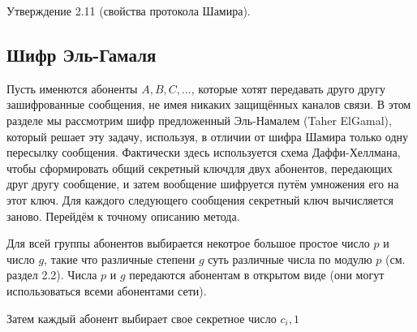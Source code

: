 \documentclass{article}
\begin{document}
 
Утверждение 2.11 (свойства протокола Шамира).
 
\setcounter{section}{2}
\setcounter{subsection}{4}
\subsection{Шифр Эль-Гамаля}
 
Пусть именются абоненты $A, B, C, ...$, которые хотят передавать друго другу зашифрованные сообщения, не имея никаких защищённых каналов связи. В этом разделе мы рассмотрим шифр предложенный Эль-Намалем (Taher ElGamal), который решает эту задачу, используя, в отличии от шифра Шамира только одну пересылку сообщения. Фактически здесь используется схема Даффи-Хеллмана, чтобы сформировать общий секретный ключдля двух абонентов, передающих друг другу сообщение, и затем вообщение шифруется путём умножения его на этот ключ. Для каждого следующего сообщения секретный ключ вычисляется заново. Перейдём к точному описанию метода.
 
Для всей группы абонентов выбирается некотрое большое простое число $p$ и число $g$, такие что различные степени $g$ суть различные числа по модулю $p$ (см. раздел 2.2). Числа $p$ и $g$ передаются абонентам в открытом виде (они могут использоваться всеми абонентами сети).
 
Затем каждый абонент выбирает свое секретное число $c_i, 1$
 
\end{document}
